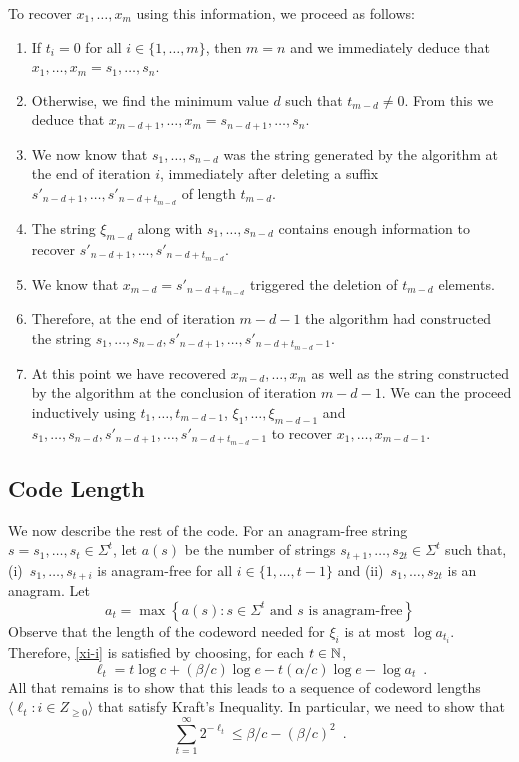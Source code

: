 \documentclass{patmorin}
\begin{document}
To recover $x_1,\ldots,x_m$ using this information, we proceed as follows:
\begin{enumerate}
  \item If $t_i=0$ for all $i\in\{1,\ldots,m\}$, then $m=n$ and we immediately deduce that $x_1,\ldots,x_m=s_1,\ldots,s_n$.
  \item Otherwise, we find the minimum value $d$ such that $t_{m-d}\neq 0$.  
  From this we deduce that $x_{m-d+1},\ldots,x_m = s_{n-d+1},\ldots,s_n$.
  \item We now know that $s_1,\ldots,s_{n-d}$ was the string generated by the algorithm at the end of iteration $i$, immediately after deleting a suffix $s'_{n-d+1},\ldots,s'_{n-d+t_{m-d}}$ of length $t_{m-d}$.
  \item The string $\xi_{m-d}$ along with $s_1,\ldots,s_{n-d}$ contains enough information to recover $s'_{n-d+1},\ldots,s'_{n-d+t_{m-d}}$.
  \item We know that $x_{m-d} = s'_{n-d+t_{m-d}}$ triggered the deletion of $t_{m-d}$ elements.
  \item Therefore, at the end of iteration $m-d-1$ the algorithm had constructed the string $s_1,\ldots,s_{n-d},s'_{n-d+1},\ldots,s'_{n-d+t_{m-d}-1}$.
  \item At this point we have recovered $x_{m-d},\ldots,x_m$ as well as the string constructed by the algorithm at the conclusion of iteration $m-d-1$.  We can the proceed inductively using $t_1,\ldots,t_{m-d-1}$, $\xi_1,\ldots,\xi_{m-d-1}$ and $s_1,\ldots,s_{n-d},s'_{n-d+1},\ldots,s'_{n-d+t_{m-d}-1}$ to recover $x_1,\ldots,x_{m-d-1}$.
\end{enumerate}

\subsection{Code Length}

We now describe the rest of the code.  For an anagram-free string $s=s_1,\ldots,s_t\in \Sigma^{t}$, let $a(s)$ be the number of strings $s_{t+1},\ldots,s_{2t}\in\Sigma^t$ such that, (i)~$s_1,\ldots,s_{t+i}$ is anagram-free for all $i\in\{1,\ldots,t-1\}$ and (ii)~$s_1,\ldots,s_{2t}$ is an anagram.  Let 
\[
   a_t = \max\left\{a(s) : \text{$s\in \Sigma^t$ and $s$ is anagram-free} \right\}
\]
Observe that the length of the codeword needed for $\xi_i$ is at most $\log a_{t_i}$.  Therefore, \eqref{xi-i} is satisfied by choosing, for each $t\in \mathbb{N}$,
\[
   \ell_t = t\log c + (\beta/c)\log e - t(\alpha/c)\log e - \log a_t   \enspace .
\]
All that remains is to show that this leads to a sequence of codeword lengths $\langle \ell_t : i\in Z_{\ge 0}\rangle$ that satisfy Kraft's Inequality.  In particular, we need to show that
\[
  \sum_{t=1}^\infty 2^{-\ell_t} \le \beta/c - (\beta/c)^2 \enspace .
\]
\end{document}
